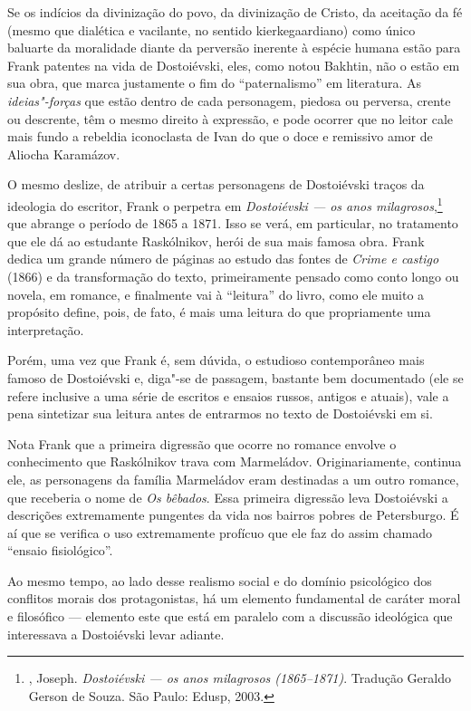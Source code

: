 Se os indícios da divinização do povo, da divinização de Cristo, da
aceitação da fé (mesmo que dialética e vacilante, no sentido
kierkegaardiano) como único baluarte da moralidade diante da perversão
inerente à espécie humana estão para Frank patentes na vida de
Dostoiévski, eles, como notou Bakhtin, não o estão em sua obra, que
marca justamente o fim do ``paternalismo'' em literatura. As
\emph{ideias"-forças} que estão dentro de cada personagem, piedosa
ou perversa, crente ou descrente, têm o mesmo direito à expressão, e
pode ocorrer que no leitor cale mais fundo a rebeldia iconoclasta de
Ivan do que o doce e remissivo amor de Aliocha Karamázov.

O mesmo deslize, de atribuir a certas personagens de Dostoiévski traços
da ideologia do escritor, Frank o perpetra em \emph{Dostoiévski --- os
anos milagrosos},\footnote{, Joseph. \emph{Dostoiévski --- os anos
  milagrosos (1865--1871)}. Tradução Geraldo Gerson de Souza. São Paulo:
  Edusp, 2003.} que abrange o período de 1865 a 1871. Isso se verá, em
particular, no tratamento que ele dá ao estudante Raskólnikov, herói de
sua mais famosa obra. Frank dedica um grande número de páginas ao estudo
das fontes de \emph{Crime e castigo} (1866) e da transformação do texto,
primeiramente pensado como conto longo ou novela, em romance, e
finalmente vai à ``leitura'' do livro, como ele muito a propósito
define, pois, de fato, é mais uma leitura do que propriamente uma
interpretação.

Porém, uma vez que Frank é, sem dúvida, o estudioso contemporâneo mais
famoso de Dostoiévski e, diga"-se de passagem, bastante bem documentado
(ele se refere inclusive a uma série de escritos e ensaios russos,
antigos e atuais), vale a pena sintetizar sua leitura antes de entrarmos
no texto de Dostoiévski em si.

Nota Frank que a primeira digressão que ocorre no romance envolve o
conhecimento que Raskólnikov trava com Marmeládov. Originariamente,
continua ele, as personagens da família Marmeládov eram destinadas a um
outro romance, que receberia o nome de \emph{Os bêbados}. Essa primeira
digressão leva Dostoiévski a descrições extremamente pungentes da vida
nos bairros pobres de Petersburgo. É aí que se verifica o uso
extremamente profícuo que ele faz do assim chamado ``ensaio
fisiológico''.

Ao mesmo tempo, ao lado desse realismo social e do domínio psicológico
dos conflitos morais dos protagonistas, há um elemento fundamental de
caráter moral e filosófico --- elemento este que está em paralelo com a
discussão ideológica que interessava a Dostoiévski levar adiante.

